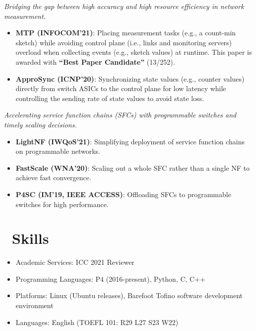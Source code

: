 \documentclass{resume}
\begin{document}
\emph{Bridging the gap between high accuracy and high resource efficiency in network measurement.}
\begin{itemize}
  \item \textbf{MTP (INFOCOM'21)}: Placing measurement tasks (e.g., a count-min sketch) while avoiding control plane (i.e., links and monitoring servers) overload when collecting events (e.g., sketch values) at runtime. This paper is awarded with \textbf{``Best Paper Candidate''} (13/252). 
  \item \textbf{ApproSync (ICNP'20)}: Synchronizing state values (e.g., counter values) directly from switch ASICs to the control plane for low latency while controlling the sending rate of state values to avoid state loss.
\end{itemize}

\emph{Accelerating service function chains (SFCs) with programmable switches and timely scaling decisions.}
\begin{itemize}
  \item \textbf{LightNF (IWQoS'21)}: Simplifying deployment of service function chains on programmable networks. 
  \item \textbf{FastScale (WNA'20)}: Scaling out a whole SFC rather than a single NF to achieve fast convergence. 
  \item \textbf{P4SC (IM'19, IEEE ACCESS)}: Offloading SFCs to programmable switches for high performance.
\end{itemize}


\section{\faCogs\ Skills}
\begin{itemize}[parsep=0.5ex]
  \item Academic Services: ICC 2021 Reviewer
  \item Programming Languages: P4 (2016-present), Python, C, C++
  \item Platforms: Linux (Ubuntu releases), Barefoot Tofino software development environment
  \item Languages: English (TOEFL 101: R29 L27 S23 W22)
\end{itemize}
\end{document}
